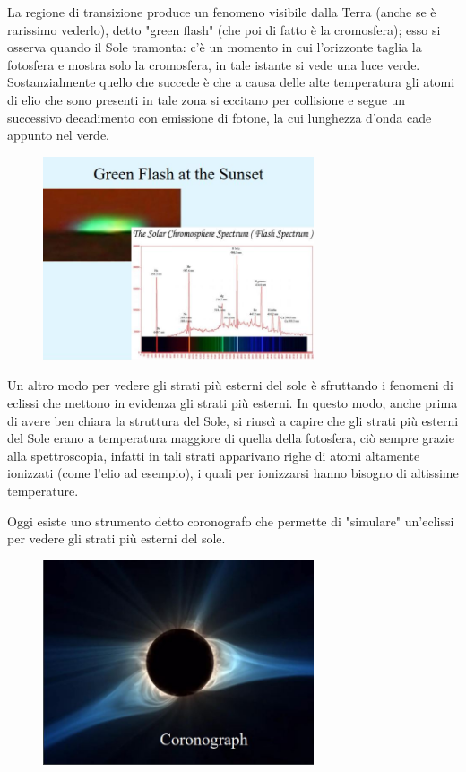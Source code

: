 La regione di transizione produce un fenomeno visibile dalla Terra (anche se è rarissimo vederlo), detto "green flash" (che poi di fatto è la cromosfera); esso si osserva quando il Sole tramonta: c'è un momento in cui l'orizzonte taglia la fotosfera e mostra solo la cromosfera, in tale istante si vede una luce verde. Sostanzialmente quello che succede è che a causa delle alte temperatura gli atomi di elio che sono presenti in tale zona si eccitano per collisione e segue un successivo decadimento con emissione di fotone, la cui lunghezza d'onda cade appunto nel verde.

\begin{figure}[H]
    \centering
    \includegraphics[width=8cm]{2dic/GreenFlash.jpg}
    \label{fig:GF}
\end{figure}

Un altro modo per vedere gli strati più esterni del sole è sfruttando i fenomeni di eclissi che mettono in evidenza gli strati più esterni. In questo modo, anche prima di avere ben chiara la struttura del Sole, si riuscì a capire che gli strati più esterni del Sole erano a temperatura maggiore di quella della fotosfera, ciò sempre grazie alla spettroscopia, infatti in tali strati apparivano righe di atomi altamente ionizzati (come l'elio ad esempio), i quali per ionizzarsi hanno bisogno di altissime temperature.

Oggi esiste uno strumento detto coronografo che permette di "simulare" un'eclissi per vedere gli strati più esterni del sole.

\begin{figure}[H]
    \centering
    \includegraphics[width=8cm]{2dic/Coronografo.jpg}
    \label{fig:Coronografo}
\end{figure}

